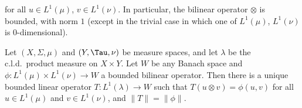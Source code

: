 

\noindent for all $u\in L^1(\mu)$, $v\in L^1(\nu)$.   In particular, the
bilinear operator $\otimes$ is bounded, with norm $1$ (except in the trivial
case in which one of $L^1(\mu)$, $L^1(\nu)$ is $0$-dimensional).

Let $(X,\Sigma,\mu)$ and $(Y,\Tau,\nu)$ be measure spaces, and let
$\lambda$ be the c.l.d.\ product measure on $X\times Y$.   Let $W$ be
any Banach space and $\phi:L^1(\mu)\times L^1(\nu)\to W$ a bounded bilinear
operator.   Then there is a unique bounded linear operator
$T:L^1(\lambda)\to W$ such that $T(u\otimes v)=\phi(u,v)$ for all
$u\in L^1(\mu)$ and $v\in L^1(\nu)$, and $\|T\|=\|\phi\|$.

